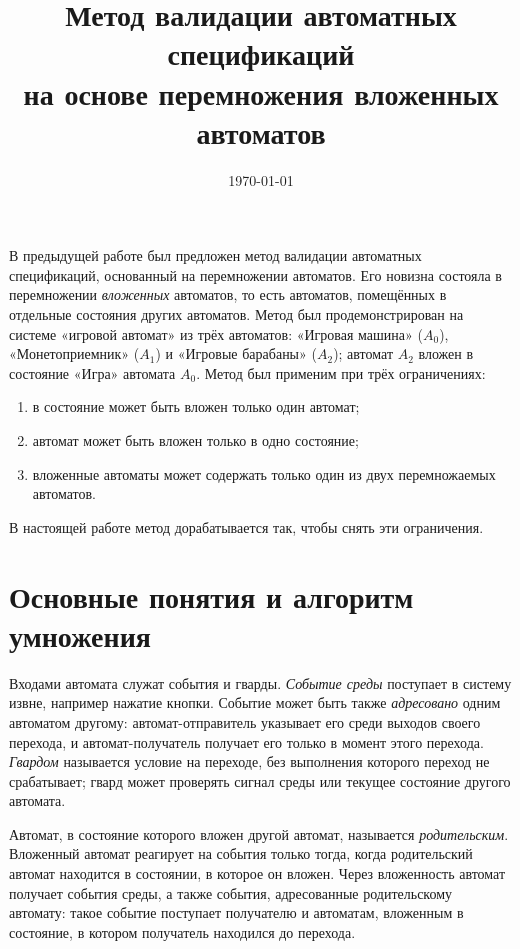 \documentclass[12pt]{article}
\title{Метод валидации автоматных спецификаций\\
на основе перемножения вложенных автоматов}
\author{}
\date{\today}
\begin{document}
\maketitle

\noindent
В предыдущей работе был предложен метод валидации автоматных спецификаций,
основанный на перемножении автоматов. Его новизна состояла в перемножении
\emph{вложенных} автоматов, то есть автоматов, помещённых в отдельные
состояния других автоматов. Метод был продемонстрирован на системе
«игровой автомат» из трёх автоматов: «Игровая машина» ($A_0$),
«Монетоприемник» ($A_1$) и «Игровые барабаны» ($A_2$); автомат $A_2$ вложен
в состояние «Игра» автомата $A_0$. Метод был применим при трёх
ограничениях:

\begin{enumerate}
  \item[1)] в состояние может быть вложен только один автомат;
  \item[2)] автомат может быть вложен только в одно состояние;
  \item[3)] вложенные автоматы может содержать только один из двух
        перемножаемых автоматов.
\end{enumerate}

В настоящей работе метод дорабатывается так, чтобы снять эти ограничения.

\section{Основные понятия и алгоритм умножения}

Входами автомата служат события и гварды. \emph{Событие среды} поступает в
систему извне, например нажатие кнопки. Событие может быть также
\emph{адресовано} одним автоматом другому: автомат-отправитель указывает
его среди выходов своего перехода, и автомат-получатель получает его только
в момент этого перехода. \emph{Гвардом} называется условие на переходе, без
выполнения которого переход не срабатывает; гвард может проверять сигнал
среды или текущее состояние другого автомата.

Автомат, в состояние которого вложен другой автомат, называется
\emph{родительским}. Вложенный автомат реагирует на события только тогда,
когда родительский автомат находится в состоянии, в которое он вложен.
Через вложенность автомат получает события среды, а также события,
адресованные родительскому автомату: такое событие поступает
получателю и автоматам, вложенным в состояние, в котором получатель
находился до перехода.
\end{document}

